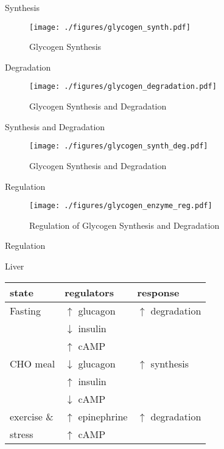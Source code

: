 \documentclass[presentation, smaller]{beamer}
\begin{document}
\begin{frame}[label={sec:orgfe1fdfb}]{Synthesis}
\begin{figure}[htbp]
\centering
\texttt{[image: ./figures/glycogen\_synth.pdf]}
\caption{\label{fig:org4e00f25}
Glycogen Synthesis}
\end{figure}
\end{frame}

\begin{frame}[label={sec:orgdf56568}]{Degradation}
\begin{figure}[htbp]
\centering
\texttt{[image: ./figures/glycogen\_degradation.pdf]}
\caption{\label{fig:org245dd56}
Glycogen Synthesis and Degradation}
\end{figure}
\end{frame}

\begin{frame}[label={sec:orgdba7633}]{Synthesis and Degradation}
\begin{figure}[htbp]
\centering
\texttt{[image: ./figures/glycogen\_synth\_deg.pdf]}
\caption{\label{fig:orgf6f8648}
Glycogen Synthesis and Degradation}
\end{figure}
\end{frame}

\begin{frame}[label={sec:orgd4f288b}]{Regulation}
\begin{figure}[htbp]
\centering
\texttt{[image: ./figures/glycogen\_enzyme\_reg.pdf]}
\caption{\label{fig:org42bf319}
Regulation of Glycogen Synthesis and Degradation}
\end{figure}
\end{frame}


\begin{frame}[label={sec:orgc5ce45d}]{Regulation}
\begin{block}{Liver}
\begin{center}
\begin{tabular}{lll}
state & regulators & response\\
\hline
Fasting & \(\uparrow\) glucagon & \(\uparrow\) degradation\\
 & \(\downarrow\) insulin & \\
 & \(\uparrow\) cAMP & \\
CHO meal & \(\downarrow\) glucagon & \(\uparrow\) synthesis\\
 & \(\uparrow\) insulin & \\
 & \(\downarrow\) cAMP & \\
exercise \& & \(\uparrow\) epinephrine & \(\uparrow\) degradation\\
stress & \(\uparrow\) cAMP & \\
\end{tabular}
\end{center}
\end{block}
\end{frame}
\end{document}
